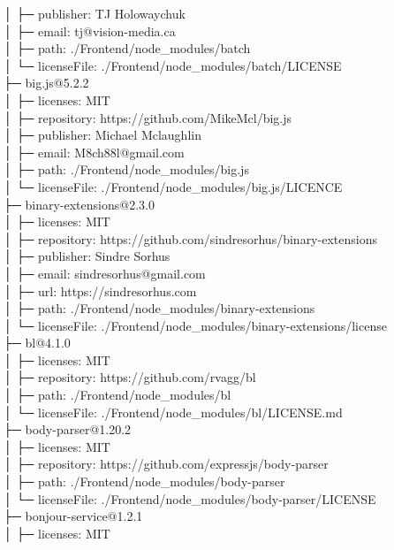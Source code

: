\documentclass[
    paper=a4,
    twoside=false,
    parskip=half,
    listof=entryprefix,
    listof=totoc,
    index=totoc,
    bibliography=totoc,
    headsepline,
]{scrbook}
\begin{document}
    │  ├─ publisher: TJ Holowaychuk\\
    │  ├─ email: tj@vision-media.ca\\
    │  ├─ path: ./Frontend/node\_modules/batch\\
    │  └─ licenseFile: ./Frontend/node\_modules/batch/LICENSE\\
    ├─ big.js@5.2.2\\
    │  ├─ licenses: MIT\\
    │  ├─ repository: https://github.com/MikeMcl/big.js\\
    │  ├─ publisher: Michael Mclaughlin\\
    │  ├─ email: M8ch88l@gmail.com\\
    │  ├─ path: ./Frontend/node\_modules/big.js\\
    │  └─ licenseFile: ./Frontend/node\_modules/big.js/LICENCE\\
    ├─ binary-extensions@2.3.0\\
    │  ├─ licenses: MIT\\
    │  ├─ repository: https://github.com/sindresorhus/binary-extensions\\
    │  ├─ publisher: Sindre Sorhus\\
    │  ├─ email: sindresorhus@gmail.com\\
    │  ├─ url: https://sindresorhus.com\\
    │  ├─ path: ./Frontend/node\_modules/binary-extensions\\
    │  └─ licenseFile: ./Frontend/node\_modules/binary-extensions/license\\
    ├─ bl@4.1.0\\
    │  ├─ licenses: MIT\\
    │  ├─ repository: https://github.com/rvagg/bl\\
    │  ├─ path: ./Frontend/node\_modules/bl\\
    │  └─ licenseFile: ./Frontend/node\_modules/bl/LICENSE.md\\
    ├─ body-parser@1.20.2\\
    │  ├─ licenses: MIT\\
    │  ├─ repository: https://github.com/expressjs/body-parser\\
    │  ├─ path: ./Frontend/node\_modules/body-parser\\
    │  └─ licenseFile: ./Frontend/node\_modules/body-parser/LICENSE\\
    ├─ bonjour-service@1.2.1\\
    │  ├─ licenses: MIT\\
\end{document}
